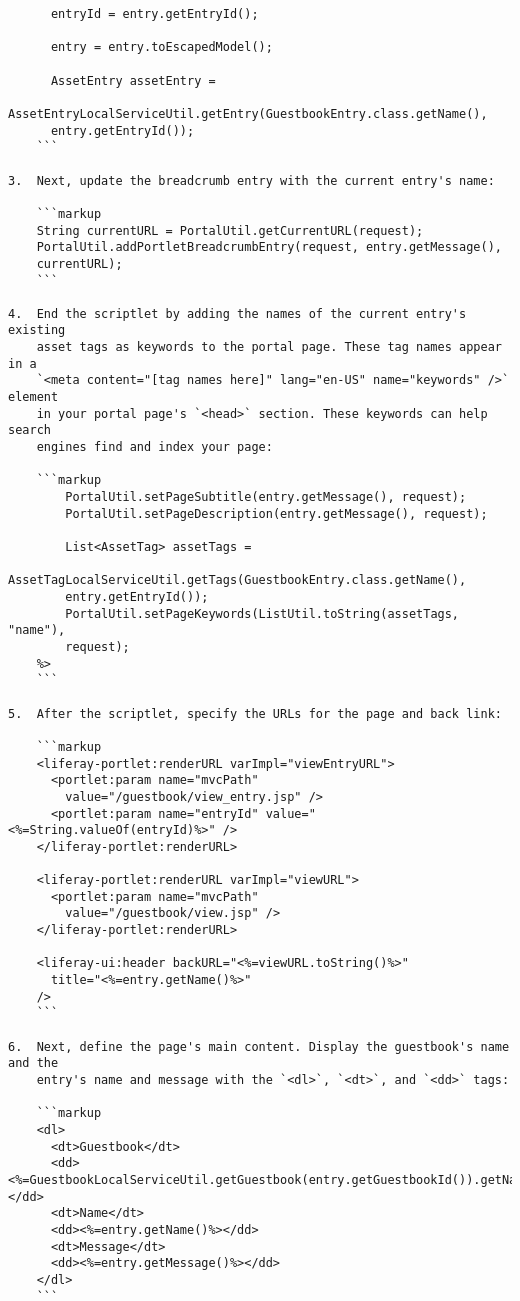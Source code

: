\begin{verbatim}
      entryId = entry.getEntryId();

      entry = entry.toEscapedModel();

      AssetEntry assetEntry = 
      AssetEntryLocalServiceUtil.getEntry(GuestbookEntry.class.getName(), 
      entry.getEntryId());
    ```

3.  Next, update the breadcrumb entry with the current entry's name: 

    ```markup
    String currentURL = PortalUtil.getCurrentURL(request);
    PortalUtil.addPortletBreadcrumbEntry(request, entry.getMessage(),
    currentURL);
    ```

4.  End the scriptlet by adding the names of the current entry's existing 
    asset tags as keywords to the portal page. These tag names appear in a 
    `<meta content="[tag names here]" lang="en-US" name="keywords" />` element 
    in your portal page's `<head>` section. These keywords can help search 
    engines find and index your page: 

    ```markup
        PortalUtil.setPageSubtitle(entry.getMessage(), request);
        PortalUtil.setPageDescription(entry.getMessage(), request);

        List<AssetTag> assetTags = 
        AssetTagLocalServiceUtil.getTags(GuestbookEntry.class.getName(), 
        entry.getEntryId());
        PortalUtil.setPageKeywords(ListUtil.toString(assetTags, "name"), 
        request);
    %>
    ```

5.  After the scriptlet, specify the URLs for the page and back link: 

    ```markup
    <liferay-portlet:renderURL varImpl="viewEntryURL">
      <portlet:param name="mvcPath"
        value="/guestbook/view_entry.jsp" />
      <portlet:param name="entryId" value="<%=String.valueOf(entryId)%>" />
    </liferay-portlet:renderURL>

    <liferay-portlet:renderURL varImpl="viewURL">
      <portlet:param name="mvcPath"
        value="/guestbook/view.jsp" />
    </liferay-portlet:renderURL>

    <liferay-ui:header backURL="<%=viewURL.toString()%>"
      title="<%=entry.getName()%>" 
    />
    ```

6.  Next, define the page's main content. Display the guestbook's name and the 
    entry's name and message with the `<dl>`, `<dt>`, and `<dd>` tags: 

    ```markup
    <dl>
      <dt>Guestbook</dt>
      <dd><%=GuestbookLocalServiceUtil.getGuestbook(entry.getGuestbookId()).getName()%></dd>
      <dt>Name</dt>
      <dd><%=entry.getName()%></dd>
      <dt>Message</dt>
      <dd><%=entry.getMessage()%></dd>
    </dl>
    ```


\end{verbatim}
